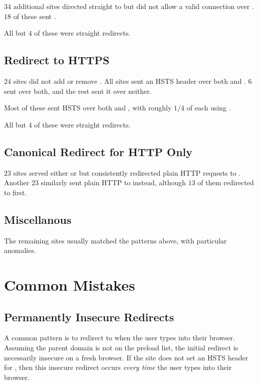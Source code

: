 \documentclass{acm_proc_article-sp}
\begin{document}
{$34$ additional sites directed straight to {\sw} but did not allow a valid connection over {\s}. $18$ of these sent {\iSD}.

All but $4$ of these were straight redirects.

\subsection{Redirect to HTTPS}

$24$ sites did not add or remove {}. All sites sent an HSTS header over both {\s} and {\sw}. $6$ sent {\iSD} over both, and the rest sent it over neither.

Most of these sent HSTS over both {\s} and {\sw}, with roughly $1/4$ of each using {\iSD}.

All but $4$ of these were straight redirects.

\subsection{Canonical Redirect for HTTP Only}

$23$ sites served either {\s} or {\sw} but consistently redirected plain HTTP requests to {\s}. Another $23$ similarly sent plain HTTP to {\sw} instead, although $13$ of them redirected to {\s} first.

\subsection{Miscellanous}
The remaining sites usually matched the patterns above, with particular anomalies.


\section{Common Mistakes}
\firstsubsectionskip
\subsection{Permanently Insecure Redirects}

A common pattern is to redirect to {\sw} when the user types \site{\genericsite} into their browser. Assuming the parent domain is not on the preload list, the initial redirect is necessarily insecure on a fresh browser. If the site does not set an HSTS header for {\s}, then this insecure redirect occurs \emph{every time} the user types \site{\genericsite} into their browser.

}
\end{document}
